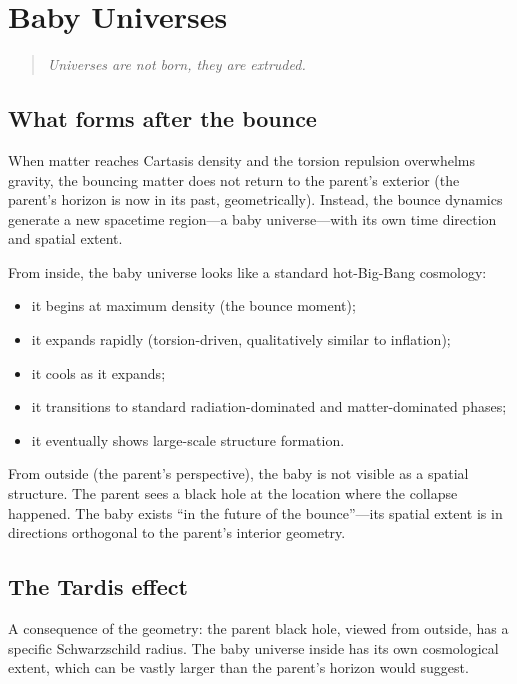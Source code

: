 \chapter{Baby Universes}
\label{chap:baby}

\begin{quote}
\itshape
Universes are not born, they are extruded.
\end{quote}

\section{What forms after the bounce}

When matter reaches Cartasis density and the torsion repulsion overwhelms
gravity, the bouncing matter does not return to the parent's exterior (the
parent's horizon is now in its past, geometrically). Instead, the bounce
dynamics generate a new spacetime region---a baby universe---with its own time
direction and spatial extent.

From inside, the baby universe looks like a standard hot-Big-Bang cosmology:

\begin{itemize}
  \item it begins at maximum density (the bounce moment);
  \item it expands rapidly (torsion-driven, qualitatively similar to inflation);
  \item it cools as it expands;
  \item it transitions to standard radiation-dominated and matter-dominated phases;
  \item it eventually shows large-scale structure formation.
\end{itemize}

From outside (the parent's perspective), the baby is not visible as a spatial
structure. The parent sees a black hole at the location where the collapse
happened. The baby exists ``in the future of the bounce''---its spatial extent
is in directions orthogonal to the parent's interior geometry.

\section{The Tardis effect}

A consequence of the geometry: the parent black hole, viewed from outside, has a
specific Schwarzschild radius. The baby universe inside has its own cosmological
extent, which can be vastly larger than the parent's horizon would suggest.

